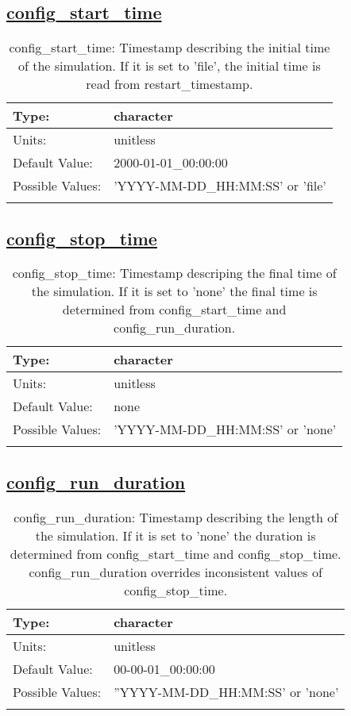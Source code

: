 \subsection[config\_start\_time]{\hyperref[sec:nm_tab_seaice_model]{config\_start\_time}}
\label{subsec:nm_sec_config_start_time}
\begin{center}
\begin{longtable}{| p{2.0in} || p{4.0in} |}
    \hline
    Type: & character \\
    \hline
    Units: & \si{unitless} \\
    \hline
    Default Value: & 2000-01-01\_00:00:00 \\
    \hline
    Possible Values: & 'YYYY-MM-DD\_HH:MM:SS' or 'file' \\
    \hline
    \caption{config\_start\_time: Timestamp describing the initial time of the simulation. If it is set to 'file', the initial time is read from restart\_timestamp.}
\end{longtable}
\end{center}
\subsection[config\_stop\_time]{\hyperref[sec:nm_tab_seaice_model]{config\_stop\_time}}
\label{subsec:nm_sec_config_stop_time}
\begin{center}
\begin{longtable}{| p{2.0in} || p{4.0in} |}
    \hline
    Type: & character \\
    \hline
    Units: & \si{unitless} \\
    \hline
    Default Value: & none \\
    \hline
    Possible Values: & 'YYYY-MM-DD\_HH:MM:SS' or 'none' \\
    \hline
    \caption{config\_stop\_time: Timestamp descriping the final time of the simulation. If it is set to 'none' the final time is determined from config\_start\_time and config\_run\_duration.}
\end{longtable}
\end{center}
\subsection[config\_run\_duration]{\hyperref[sec:nm_tab_seaice_model]{config\_run\_duration}}
\label{subsec:nm_sec_config_run_duration}
\begin{center}
\begin{longtable}{| p{2.0in} || p{4.0in} |}
    \hline
    Type: & character \\
    \hline
    Units: & \si{unitless} \\
    \hline
    Default Value: & 00-00-01\_00:00:00 \\
    \hline
    Possible Values: & ''YYYY-MM-DD\_HH:MM:SS' or 'none' \\
    \hline
    \caption{config\_run\_duration: Timestamp describing the length of the simulation. If it is set to 'none' the duration is determined from config\_start\_time and config\_stop\_time. config\_run\_duration overrides inconsistent values of config\_stop\_time.}
\end{longtable}
\end{center}
